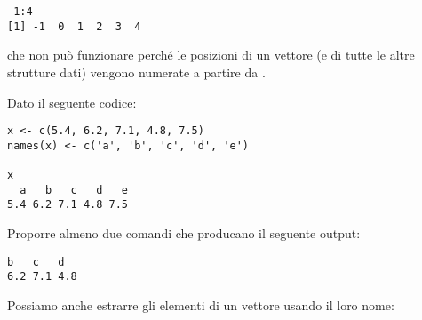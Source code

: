 \begin{lstlisting}[style=Rstyle]
-1:4
[1] -1  0  1  2  3  4
\end{lstlisting}
%
che non pu\`o funzionare perch\'e le posizioni di un vettore (e di tutte le altre strutture dati) vengono numerate a partire da . 


\vspace{0.5cm} 

\begin{exercise}\label{ex3.4}
	
\noindent Dato il seguente codice:

\begin{lstlisting}[style=Rstyle]
x <- c(5.4, 6.2, 7.1, 4.8, 7.5)
names(x) <- c('a', 'b', 'c', 'd', 'e')

x
  a   b   c   d   e
5.4 6.2 7.1 4.8 7.5 
\end{lstlisting}

Proporre almeno due comandi che producano il seguente output:

\begin{lstlisting}[style=Rstyle]
  b   c   d
6.2 7.1 4.8 
\end{lstlisting}
	
\end{exercise}

\noindent Possiamo anche estrarre gli elementi di un vettore usando il loro nome:

